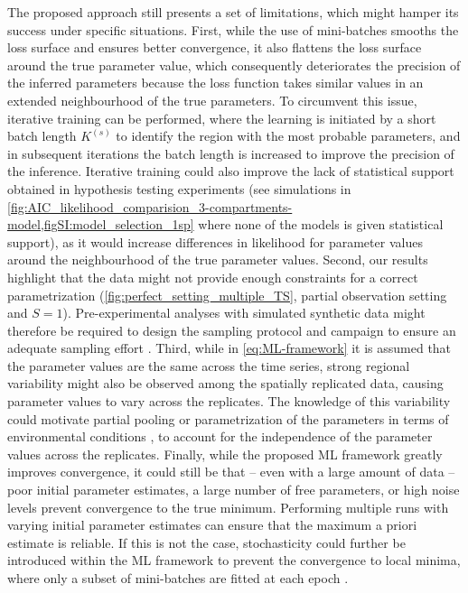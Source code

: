 The proposed approach still presents a set of limitations, which might hamper its success under specific situations. 
% 
First, while the use of mini-batches smooths the loss surface and ensures better convergence, it also flattens the loss surface around the true parameter value, which consequently deteriorates the precision of the inferred parameters because the loss function takes similar values in an extended neighbourhood of the true parameters. 
To circumvent this issue, iterative training can be performed, where the learning is initiated by a short batch length $K^{(s)}$ to identify the region with the most probable parameters, and in subsequent iterations the batch length is increased to improve the precision of the inference. 
% 
Iterative training could also improve the lack of statistical support obtained in hypothesis testing experiments (see simulations in \cref{fig:AIC_likelihood_comparision_3-compartments-model,figSI:model_selection_1sp} where none of the models is given statistical support), as it would increase differences in likelihood for parameter values around the neighbourhood of the true parameter values.
% 
Second, our results highlight that the data might not provide enough constraints for a correct parametrization (\cref{fig:perfect_setting_multiple_TS}, partial observation setting and $S=1$). Pre-experimental analyses with simulated synthetic data might therefore be required to design the sampling protocol and campaign to ensure an adequate sampling effort \citep{Banks2017,Laubmeier2018}. %
%
Third, while in \cref{eq:ML-framework} it is assumed that the parameter values are the same across the time series, strong regional variability might also be observed among the spatially replicated data, causing parameter values to vary across the replicates. The knowledge of this variability could motivate partial pooling \citep{Beaumont2010} or parametrization of the parameters in terms of environmental conditions \citep{Pahlow2008}, to account for the independence of the parameter values across the replicates.
%
Finally, while the proposed ML framework greatly improves convergence, it could still be that -- even with a large amount of data -- poor initial parameter estimates, a large number of free parameters, or high noise levels prevent convergence to the true minimum. Performing multiple runs with varying initial parameter estimates can ensure that the maximum a priori estimate is reliable. If this is not the case, stochasticity could further be introduced within the ML framework to prevent the convergence to local minima, where only a subset of mini-batches are fitted at each epoch \citep{bottou2012stochastic}.

